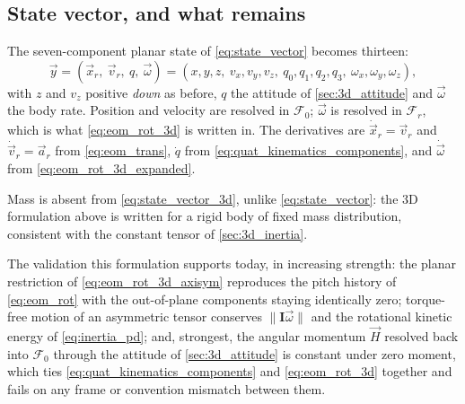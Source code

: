\subsection{State vector, and what remains}\label{sec:3d_state}
The seven-component planar state of \autoref{eq:state_vector} becomes thirteen:
\begin{equation} \label{eq:state_vector_3d}
    \vec{y} = \left(\vec{x}_r,\ \vec{v}_r,\ q,\ \vec\omega\right)
        = \left(x,y,z,\ v_x,v_y,v_z,\ q_0,q_1,q_2,q_3,\ \omega_x,\omega_y,\omega_z\right),
\end{equation}
with $z$ and $v_z$ positive \emph{down} as before, $q$ the attitude of
\autoref{sec:3d_attitude} and $\vec\omega$ the body rate. Position and velocity are resolved in
$\mathcal{F}_0$; $\vec\omega$ is resolved in $\mathcal{F}_r$, which is what
\autoref{eq:eom_rot_3d} is written in. The derivatives are
$\dot{\vec{x}}_r=\vec{v}_r$ and $\dot{\vec{v}}_r=\vec{a}_r$ from \autoref{eq:eom_trans},
$\dot q$ from \autoref{eq:quat_kinematics_components}, and $\dot{\vec\omega}$ from
\autoref{eq:eom_rot_3d_expanded}.

Mass is absent from \autoref{eq:state_vector_3d}, unlike \autoref{eq:state_vector}: the 3D
formulation above is written for a rigid body of fixed mass distribution, consistent with the
constant tensor of \autoref{sec:3d_inertia}.

The validation this formulation supports today, in increasing strength: the planar restriction of
\autoref{eq:eom_rot_3d_axisym} reproduces the pitch history of \autoref{eq:eom_rot} with the
out-of-plane components staying identically zero; torque-free motion of an asymmetric tensor
conserves $\lVert\mathbf{I}\vec\omega\rVert$ and the rotational kinetic energy of
\autoref{eq:inertia_pd}; and, strongest, the angular momentum $\vec{H}$ resolved back into
$\mathcal{F}_0$ through the attitude of \autoref{sec:3d_attitude} is constant under zero moment,
which ties \autoref{eq:quat_kinematics_components} and \autoref{eq:eom_rot_3d} together and fails
on any frame or convention mismatch between them.

